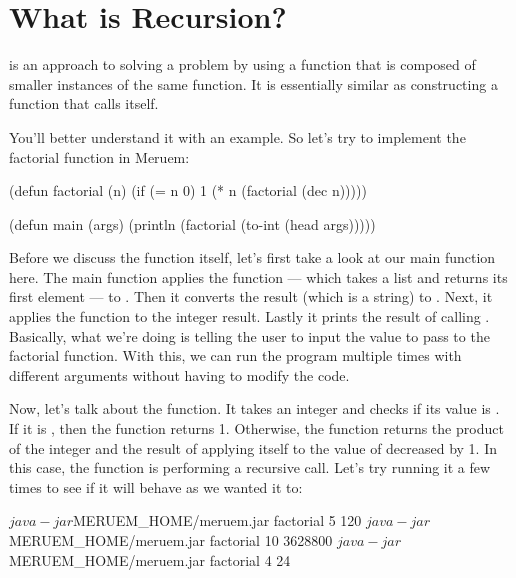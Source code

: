 \section{What is Recursion?}
 is an approach to solving a problem by using a function that is composed of smaller instances of the same function. It is essentially similar as constructing a function that calls itself. 

You'll better understand it with an example. So let's try to implement the factorial function in Meruem:

\begin{Meruem}
(defun factorial (n)
  (if (= n 0)
    1
    (* n (factorial (dec n)))))

(defun main (args)
  (println (factorial 
             (to-int (head args)))))
\end{Meruem}

Before we discuss the  function itself, let's first take a look at our main function here. The main function applies the  function --- which takes a list and returns its first element --- to . Then it converts the result (which is a string) to . Next, it applies the  function to the integer result. Lastly it prints the result of calling . Basically, what we're doing is telling the user to input the value to pass to the factorial function. With this, we can run the program multiple times with different arguments without having to modify the code.

Now, let's talk about the  function. It takes an integer and checks if its value is . If it is , then the function returns 1. Otherwise, the function returns the product of the integer  and the result of applying itself to the value of  decreased by 1. In this case, the  function is performing a recursive call. Let's try running it a few times to see if it will behave as we wanted it to:

\begin{REPL}
$  java -jar $MERUEM_HOME/meruem.jar factorial 5
120
$ java -jar $MERUEM_HOME/meruem.jar factorial 10
3628800
$ java -jar $MERUEM_HOME/meruem.jar factorial 4
24
\end{REPL}
